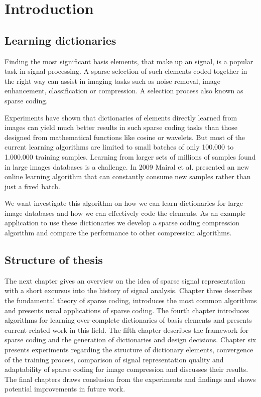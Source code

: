 \chapter{Introduction}
\label{sec:introduction}
\section{Learning dictionaries}

Finding the most significant basis elements, that make up an
signal, is a popular task in signal processing. A sparse selection of such
elements coded together in the right way can assist in imaging tasks such as
noise removal, image enhancement, classification or compression. A selection
process also known as sparse coding.

Experiments \cite{Chen1998,Elad2006} have shown that dictionaries of 
elements directly learned from images can yield much better results in
such sparse coding tasks than those designed from mathematical functions like
cosine or wavelets. But most of the current learning algorithms are limited to
small batches of only 100.000 to 1.000.000 training samples. Learning from
larger sets of millions of samples found in large images databases is a
challenge. In 2009 Mairal et al.\cite{Mairal2009} presented an new online
learning algorithm that can constantly consume new samples rather than just a
fixed batch. 

We want investigate this algorithm on how we can learn dictionaries
for large image databases and how we can effectively code the elements.
As an example application to use these dictionaries we develop a sparse coding
compression algorithm and compare the performance to other
compression algorithms.

\section{Structure of thesis}
The next chapter gives an overview on the idea of sparse signal
representation with a short excursus into the history of signal analysis.
Chapter three describes the fundamental theory of sparse coding, introduces the
most common algorithms and presents usual applications of sparse coding. The
fourth chapter introduces algorithms for learning over-complete
dictionaries of basis elements and presents current related work in this field.
The fifth chapter describes the framework for sparse coding and the generation
of dictionaries and design decisions. Chapter six presents experiments regarding
the structure of dictionary elements, convergence of the training process,
comparison of signal representation quality and adaptability of sparse coding
for image compression and discusses their results. The final chapters draws
conslusion from the experiments and findings and shows potential improvements in
future work. 



